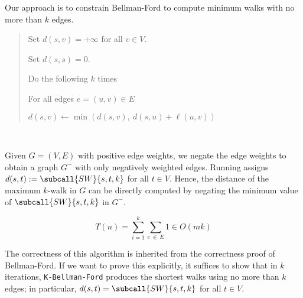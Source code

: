 \documentclass{article}
\begin{document}
\begin{solution}
Our approach is to constrain Bellman-Ford to compute minimum walks with no more than $k$ edges.

\begin{quote}%


\begin{steps}
  \item Set $d(s, v) = +\infty$ for all $v \in V$.
  \item Set $d(s,s) = 0.$
  \item Do the following $k$ times
  \begin{steps}
      \item For all edges $e=(u,v) \in E$
      \begin{steps}
          \item $d(s,v) \leftarrow \min (d(s,v), \ d(s,u) + \ell(u,v))$
      \end{steps}
  \end{steps}
\end{steps}
\end{quote}

\

Given $G = (V, E)$ with positive edge weights, we negate the edge weights to obtain a graph $G^{-}$ with only negatively weighted edges.
Running  assigns $d (s,t) := \subcall{SW}{s,t,k}$ for all $t \in V$.
Hence, the distance of the maximum $k$-walk in $G$ can be directly computed by negating the minimum value of $\subcall{SW}{s, t, k}$ in $G^{-}$.

\begin{subproof}[Runtime.]
\[T(n) = \sum_{i=1}^{k} \sum_{e \ \in \ E} 1 \in O(mk)\]
\end{subproof}

\begin{subproof}[Correctness.]
The correctness of this algorithm is inherited from the correctness proof of Bellman-Ford. If we want to prove this explicitly, it suffices to show that in $k$ iterations, \texttt{K-Bellman-Ford} produces the shortest walks using no more than $k$ edges; in particular, $d(s,t) = \subcall{SW}{s,t,k}$ for all $t \in V$.


\end{subproof}
\end{solution}
\end{document}
